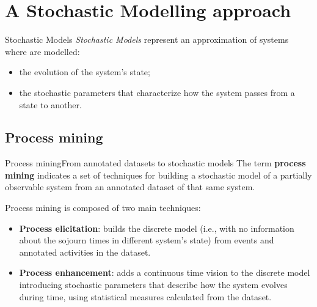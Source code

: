 \documentclass[9pt, handout]{beamer}
\begin{document}
  \section{A Stochastic Modelling approach}
    \begin{frame}{Stochastic Models}
      \pause
      \textit{Stochastic Models} represent an approximation of systems where are modelled:
      \pause
      \begin{itemize}
        \item the evolution of the system's state;
        \pause
        \item the stochastic parameters that characterize how the system passes from a state to another.
      \end{itemize}
      \pause
    \end{frame}
    
    \subsection{Process mining}
      \begin{frame}{Process mining}{From annotated datasets to stochastic models}
        \pause
        The term \textbf{process mining} indicates a set of techniques for building a stochastic model of a partially observable system from an annotated dataset of that same system.
        
        \pause
        \vspace{1em}
        Process mining is composed of two main techniques:
        \pause
        \begin{itemize}
          \item \textbf{Process elicitation}: builds the discrete model (i.e., with no information about the sojourn times in different system's state) from events and annotated activities in the dataset.
          \pause
          \item \textbf{Process enhancement}: adds a continuous time vision to the discrete model introducing stochastic parameters that describe how the system evolves during time, using statistical measures calculated from the dataset.
        \end{itemize}
      \end{frame}
      
\end{document}
